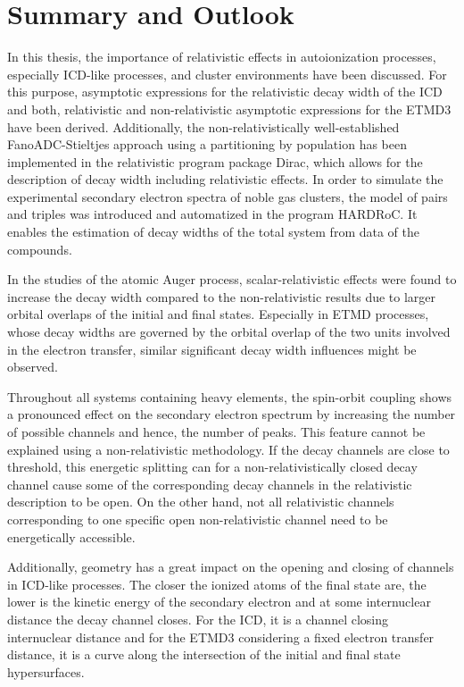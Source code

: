 \chapter{Summary and Outlook}

In this thesis, the importance of relativistic effects in autoionization
processes, especially \ac{ICD}-like
processes, and cluster environments have been discussed.
For this purpose, asymptotic expressions for the relativistic decay width of the ICD
and both, relativistic and non-relativistic asymptotic expressions for the ETMD3
have been derived. Additionally, the non-relativistically well-established
FanoADC-Stieltjes approach
using a partitioning by population has been implemented
in the relativistic program package Dirac,
which allows for the
description of decay width including relativistic effects.
In order to simulate the experimental secondary electron spectra of noble gas
clusters, the model of pairs and triples was introduced and automatized in the
program HARDRoC. It enables the estimation of
decay widths of the total system from data of the compounds.

In the studies of the atomic Auger process, scalar-relativistic effects were
found to increase the decay width compared to the non-relativistic results
due to larger orbital overlaps of the initial and final states. Especially
in ETMD processes, whose decay widths are governed by the orbital overlap
of the two units involved in the electron transfer, similar significant
decay width influences might be observed.

Throughout all systems containing heavy elements, the spin-orbit coupling
shows a pronounced effect on the secondary electron spectrum by increasing the
number of possible channels and hence, the number of peaks. This feature cannot
be explained using a non-relativistic methodology.
If the decay channels are close to threshold, this energetic splitting
can for a non-relativistically closed decay channel cause some of the
corresponding decay channels in the relativistic description to be open. On
the other hand, not all relativistic channels corresponding to one specific
open non-relativistic channel need to be energetically accessible.

Additionally, geometry has a great impact on the opening and closing of channels
in \ac{ICD}-like processes. The closer the ionized atoms of the final state are,
the lower is the kinetic energy of the secondary electron and at some
internuclear distance the decay channel closes. For the ICD, it is a channel
closing internuclear distance and for the ETMD3 considering a fixed electron
transfer distance, it is a curve along the intersection of the initial and final
state hypersurfaces.

